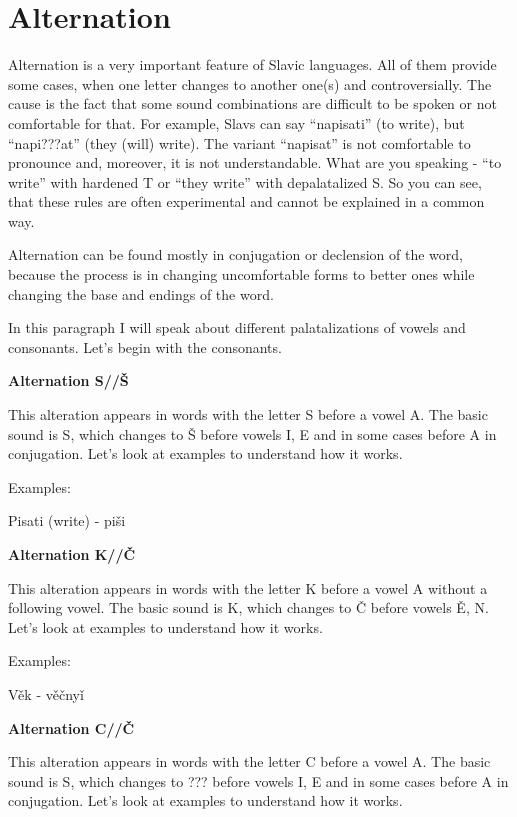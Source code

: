 \section{Alternation}

Alternation is a very important feature of Slavic languages. All of them provide some cases, when one letter changes to another one(s) and controversially. The cause is the fact that some sound combinations are difficult to be spoken or not comfortable for that. For example, Slavs can say “napisati” (to write), but “napi???at” (they (will) write). The variant “napisat” is not comfortable to pronounce and, moreover, it is not understandable. What are you speaking - “to write” with hardened T or “they write” with depalatalized S. So you can see, that these rules are often experimental and cannot be explained in a common way.

Alternation can be found mostly in conjugation or declension of the word, because the process is in changing uncomfortable forms to better ones while changing the base and endings of the word. 

In this paragraph I will speak about different palatalizations of vowels and consonants. Let’s begin with the consonants.

\textbf{Alternation S//Š}

This alteration appears in words with the letter S before a vowel A. The basic sound is S, which changes to Š before vowels I, E and in some cases before A in conjugation. Let’s look at examples to understand how it works.

Examples:

Pisati (write) \textipa{[’pisat1]} - piši \textipa{[pi’\:s1]}


\textbf{Alternation K//Č}

This alteration appears in words with the letter K before a vowel A without a following vowel. The basic sound is K, which changes to Č before vowels Ě, N. Let’s look at examples to understand how it works.

Examples:

Věk \textipa{[’pisat1]} - věčnyǐ \textipa{[pi’\:s1]}



\textbf{Alternation C//Č}

This alteration appears in words with the letter C before a vowel A. The basic sound is S, which changes to ??? before vowels I, E and in some cases before A in conjugation. Let’s look at examples to understand how it works.


